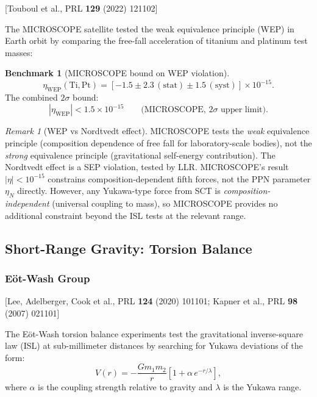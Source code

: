 \documentclass[11pt,a4paper]{article}
\theoremstyle{plain}
\theoremstyle{definition}
\newtheorem{benchmark}[theorem]{Benchmark}
\theoremstyle{remark}
\newtheorem{remark}[theorem]{Remark}
\newcommand{\fromlit}[1]{\textcolor{sctblue}{\textsf{[#1]}}}
\begin{document}
\fromlit{Touboul et al., PRL \textbf{129} (2022) 121102}

The MICROSCOPE satellite tested the weak equivalence principle (WEP)
in Earth orbit by comparing the free-fall acceleration of
titanium and platinum test masses:

\begin{benchmark}[MICROSCOPE bound on WEP violation]
\label{bench:microscope}
\begin{equation}\label{eq:microscope}
  \eta_{\mathrm{WEP}}(\mathrm{Ti,Pt})
  = [-1.5 \pm 2.3\,(\mathrm{stat})
    \pm 1.5\,(\mathrm{syst})] \times 10^{-15}.
\end{equation}
The combined $2\sigma$ bound:
\begin{equation}\label{eq:microscope-bound}
  |\eta_{\mathrm{WEP}}| < 1.5 \times 10^{-15}
  \qquad\text{(MICROSCOPE, $2\sigma$ upper limit)}.
\end{equation}
\end{benchmark}

\begin{remark}[WEP vs Nordtvedt effect]
MICROSCOPE tests the \emph{weak} equivalence principle (composition
dependence of free fall for laboratory-scale bodies), not the
\emph{strong} equivalence principle (gravitational self-energy
contribution).  The Nordtvedt effect is a SEP violation, tested
by LLR.  MICROSCOPE's result $|\eta| < 10^{-15}$ constrains
composition-dependent fifth forces, not the PPN parameter $\eta_N$
directly.  However, any Yukawa-type force from SCT is
\emph{composition-independent} (universal coupling to mass),
so MICROSCOPE provides no additional constraint beyond the ISL
tests at the relevant range.
\end{remark}

\subsection{Short-Range Gravity: Torsion Balance}

\subsubsection{E\"ot-Wash Group}

\fromlit{Lee, Adelberger, Cook et al., PRL \textbf{124} (2020) 101101;
Kapner et al., PRL \textbf{98} (2007) 021101}

The E\"ot-Wash torsion balance experiments test the gravitational
inverse-square law (ISL) at sub-millimeter distances by searching
for Yukawa deviations of the form:
\begin{equation}\label{eq:yukawa-param}
  V(r) = -\frac{Gm_1 m_2}{r}\left[
    1 + \alpha\,e^{-r/\lambda}
  \right],
\end{equation}
where $\alpha$ is the coupling strength relative to gravity and
$\lambda$ is the Yukawa range.
\end{document}
